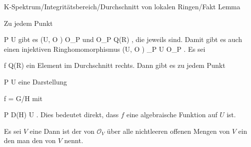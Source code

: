 {K-Spektrum/Integritätsbereich/Durchschnitt von lokalen Ringen/Fakt}
{Lemma}
{}
{



\faktsituation {}
\faktzusatz {}





}
{





Zu jedem Punkt

\mavergleichskette
{\vergleichskette
{ P
}
{ \in }{ U
}
{  }{
}
{    }{
}
{   }{
}
}
{}{}{}
gibt es
\maabb {} { \Gamma (U, {\mathcal O} )  } { {\mathcal O}_P
} {}
und
\maabb {} { {\mathcal O}_P } { Q(R)
} {,}
die jeweils
sind. Damit gibt es auch einen injektiven Ringhomomorphismus
\maabbdisp {} { \Gamma (U, {\mathcal O} ) } { \bigcap_{P \in U} {\mathcal O}_P
} {.}
Es sei

\mavergleichskette
{\vergleichskette
{ f
}
{ \in }{ Q(R)
}
{  }{
}
{    }{
}
{   }{
}
}
{}{}{}
ein Element im Durchschnitt rechts. Dann gibt es zu jedem Punkt

\mavergleichskette
{\vergleichskette
{ P
}
{ \in }{ U
}
{  }{
}
{    }{
}
{   }{
}
}
{}{}{}
eine Darstellung

\mavergleichskette
{\vergleichskette
{ f
}
{ = }{ G/H
}
{  }{
}
{    }{
}
{   }{
}
}
{}{}{}
mit

\mavergleichskette
{\vergleichskette
{ P
}
{ \in }{ D(H)
}
{ \subseteq }{ U
}
{    }{
}
{   }{
}
}
{}{}{.}
Dies bedeutet direkt, dass $f$ eine algebraische Funktion auf $U$ ist.




}





{}
{





Es sei $V$ eine
Dann ist der
von ${\mathcal O}_{ V }$ über alle nichtleeren offenen Mengen von $V$ ein
den man den  von $V$ nennt.





}
